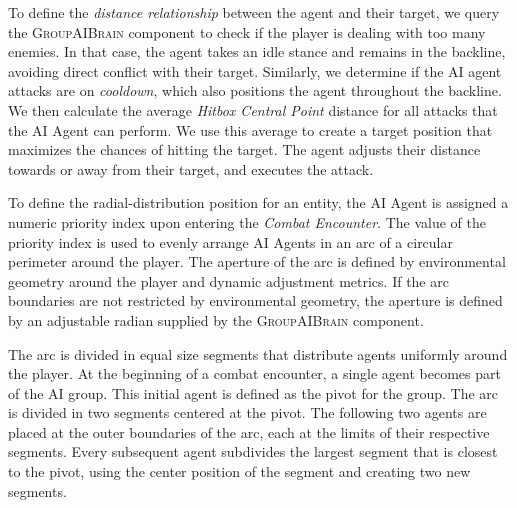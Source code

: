 To define the \emph{distance relationship} between the agent and their target, we query the \textsc{GroupAIBrain} component to check if the player is dealing with too many enemies. In that case, the agent takes an idle stance and remains in the backline, avoiding direct conflict with their target. Similarly, we determine if the AI agent attacks are on \emph{cooldown}, which also positions the agent throughout the backline. We then calculate the average \emph{Hitbox Central Point} distance for all attacks that the AI Agent can perform. We use this average to create a target position that maximizes the chances of hitting the target. The agent adjusts their distance towards or away from their target, and executes the attack.


To define the radial-distribution position for an entity, the AI Agent is assigned a numeric priority index upon entering the \emph{Combat Encounter}. The value of the priority index is used to evenly arrange AI Agents in an arc of a circular perimeter around the player. The aperture of the arc is defined by environmental geometry around the player and dynamic adjustment metrics. If the arc boundaries are not restricted by environmental geometry, the aperture is defined by an adjustable radian supplied by the \textsc{GroupAIBrain} component.

The arc is divided in equal size segments that distribute agents uniformly around the player. At the beginning of a combat encounter, a single agent becomes part of the AI group. This initial agent is defined as the pivot for the group. The arc is divided in two segments centered at the pivot. The following two agents are placed at the outer boundaries of the arc, each at the limits of their respective segments. Every subsequent agent subdivides the largest segment that is closest to the pivot, using the center position of the segment and creating two new segments.

